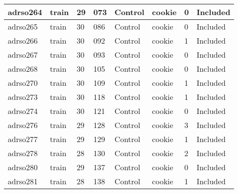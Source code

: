 \begin{center}
\begin{longtable}{|l|l|l|l|l|l|l|l|}
adrso264       & train                 & 29              & 073                & Control              & cookie          & 0                & Included      \\ \hline
adrso265       & train                 & 30              & 086                & Control              & cookie          & 0                & Included      \\ \hline
adrso266       & train                 & 30              & 092                & Control              & cookie          & 1                & Included      \\ \hline
adrso267       & train                 & 30              & 093                & Control              & cookie          & 0                & Included      \\ \hline
adrso268       & train                 & 30              & 105                & Control              & cookie          & 0                & Included      \\ \hline
adrso270       & train                 & 30              & 109                & Control              & cookie          & 1                & Included      \\ \hline
adrso273       & train                 & 30              & 118                & Control              & cookie          & 1                & Included      \\ \hline
adrso274       & train                 & 30              & 121                & Control              & cookie          & 0                & Included      \\ \hline
adrso276       & train                 & 29              & 128                & Control              & cookie          & 3                & Included      \\ \hline
adrso277       & train                 & 29              & 129                & Control              & cookie          & 1                & Included      \\ \hline
adrso278       & train                 & 28              & 130                & Control              & cookie          & 2                & Included      \\ \hline
adrso280       & train                 & 29              & 137                & Control              & cookie          & 0                & Included      \\ \hline
adrso281       & train                 & 28              & 138                & Control              & cookie          & 1                & Included      \\ \hline

\end{longtable}
\end{center}
